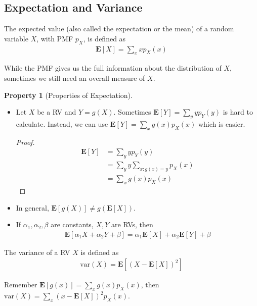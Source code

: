 \documentclass[device=normal, lang=en, fontsize=12pt]{elegantnote}
\numberwithin{equation}{section}
\theoremstyle{definition} %
\newtheorem{property}{Property}[section] %
\begin{document}
\subsection{Expectation and Variance}
\begin{definition}
    The expected value (also called the expectation or the mean) of a random variable $X$, with PMF $p_{X}$, is defined as
    \begin{align}
        \mathbf{E}[X] = \sum_{x} x p_{X}(x)
    \end{align}
\end{definition}
While the PMF gives us the full information about the distribution of $X$, sometimes we still need an overall measure of $X$.
\begin{property}[Properties of Expectation] ~ 
    \begin{itemize}
        \item Let $X$ be a RV and $Y = g(X)$. Sometimes $\mathbf{E}[Y] = \sum_{y} y p_{Y}(y)$ is hard to calculate. Instead, we can use $\mathbf{E}[Y] = \sum_{x} g(x) p_{X}(x)$ which is easier.
        \begin{proof}
            \begin{align}
                \mathbf{E}[Y] &= \sum_{y} y p_{Y}(y) \\
                              &= \sum_{y} y \sum_{x: g(x) = y} p_{X}(x) \\
                              &= \sum_{x} g(x) p_{X}(x)
            \end{align}
        \end{proof}
        \item In general, $\mathbf{E}[g(X)] \neq g(\mathbf{E}[X])$.
        \item If $\alpha_1, \alpha_2, \beta$ are constants, $X, Y$ are RVs, then
        \begin{align}
            \mathbf{E}[\alpha_1 X + \alpha_2 Y + \beta] = \alpha_1 \mathbf{E}[X] + \alpha_2 \mathbf{E}[Y] + \beta
        \end{align}
    \end{itemize}
\end{property}
\begin{definition}
    The variance of a RV $X$ is defined as
    \begin{align}
        \mathrm{var}(X) = \mathbf{E}[(X - \mathbf{E}[X])^{2}]
    \end{align}
\end{definition}
Remember $\mathbf{E}[g(x)] = \sum_{x} g(x) p_{X}(x)$, then $\mathrm{var}(X) = \sum_{x} (x - \mathbf{E}[X])^{2} p_{X}(x)$.
\end{document}
